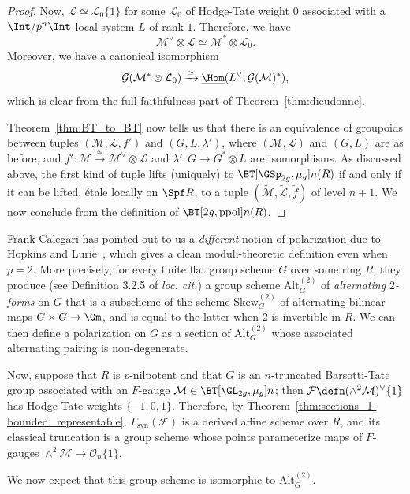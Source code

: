 \documentclass[10pt]{amsart}
\begin{document}
\begin{proof}
Now, $\mathcal{L}\simeq \mathcal{L}_0\{1\}$ for some $\mathcal{L}_0$ of Hodge-Tate weight $0$ associated with a $\Int/p^n\Int$-local system $L$ of rank $1$. Therefore, we have
\[
\mathcal{M}^\vee\otimes \mathcal{L}\simeq \mathcal{M}^*\otimes \mathcal{L}_0.
\]
Moreover, we have a canonical isomorphism
\[
\mathcal{G}(\mathcal{M}^*\otimes \mathcal{L}_0)\xrightarrow{\simeq}\underline{\Hom}(L^\vee,\mathcal{G}(\mathcal{M})^*),
\]
which is clear from the full faithfulness part of Theorem~\ref{thm:dieudonne}.


Theorem~\ref{thm:BT_to_BT} now tells us that there is an equivalence of groupoids between tuples $(\mathcal{M},\mathcal{L},f')$ and $(G,L,\lambda')$, where $(\mathcal{M},\mathcal{L})$ and $(G,L)$ are as before, and $f':\mathcal{M}\xrightarrow{\simeq}\mathcal{M}^\vee\otimes \mathcal{L}$ and $\lambda':G \to G^*\otimes L$ are isomorphisms. As discussed above, the first kind of tuple lifts (uniquely) to $\BT[\GSp_{2g},\mu_g]{n}(R)$ if and only if it can be lifted, \'etale locally on $\Spf R$, to a tuple $(\tilde{\mathcal{M}},\tilde{\mathcal{L}},\tilde{f})$ of level $n+1$. We now conclude from the definition of $\BT[2g,\mathrm{ppol}]{n}(R)$.
\end{proof}

\begin{remark}
\label{rem:hopkins_lurie}
Frank Calegari has pointed out to us a \emph{different} notion of polarization due to Hopkins and Lurie~\cite[\S 3]{lurie_hopkins}, which gives a clean moduli-theoretic definition even when $p=2$. More precisely, for every finite flat group scheme $G$ over some ring $R$, they produce (see Definition 3.2.5 of \emph{loc. cit.}) a group scheme $\mathrm{Alt}^{(2)}_G$ of \emph{alternating $2$-forms} on $G$ that is a subscheme of the scheme $\mathrm{Skew}^{(2)}_G$ of alternating bilinear maps $G\times G\to \Gm$, and is equal to the latter when $2$ is invertible in $R$. We can then define a polarization on $G$ as a section of $\mathrm{Alt}^{(2)}_G$ whose associated alternating pairing is non-degenerate.

Now, suppose that $R$ is $p$-nilpotent and that $G$ is an $n$-truncated Barsotti-Tate group associated with an $F$-gauge $\mathcal{M}\in \BT[\GL_{2g},\mu_g]{n}$; then $\mathcal{F} \defn (\wedge^2 \mathcal{M})^\vee\{1\}$ has Hodge-Tate weights $\{-1,0,1\}$. Therefore, by Theorem~\ref{thm:sections_1-bounded_representable}, $\Gamma_{\mathrm{syn}}(\mathcal{F})$ is a derived affine scheme over $R$, and its classical truncation is a group scheme whose points parameterize maps of $F$-gauges $\wedge^2 \mathcal{M}\to \mathcal{O}_n\{1\}$. 

We now expect that this group scheme is isomorphic to $\mathrm{Alt}^{(2)}_G$.
\end{remark}
\end{document}
